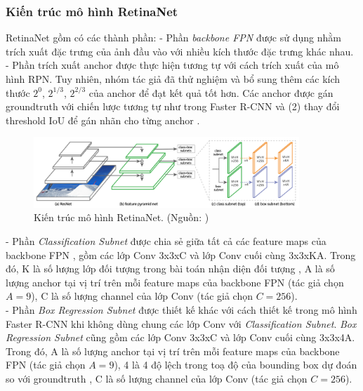 {    \subsubsection{Kiến trúc mô hình RetinaNet}
    RetinaNet  gồm có các thành phần:
    - Phần \textit{backbone FPN} được sử dụng nhằm trích xuất đặc trưng của ảnh đầu vào với nhiều kích thước đặc trưng khác nhau.
    - Phần trích xuất anchor  được thực hiện tương tự với cách trích xuất của mô hình RPN.
    Tuy nhiên, nhóm tác giả đã thử nghiệm và bổ sung thêm các kích thước $2^{0}$, $2^{1/3}$, $2^{2/3}$ của anchor  để đạt kết quả tốt hơn.
    Các anchor  được gán groundtruth  với chiến lược tương tự như trong Faster R-CNN  \cite{ren2015faster} và (2) thay đổi threshold IoU  để gán nhãn cho từng anchor .

    \begin{figure}[H]
        \centering
        \includegraphics[width=10cm] {images/retinanet_model}
        \caption{Kiến trúc mô hình RetinaNet. (Nguồn: \cite{lin2017focal})}
        \label{fig:retinanet_model}
    \end{figure}

    \noindent
    - Phần \textit{Classification Subnet} được chia sẻ giữa tất cả các feature maps  của backbone FPN , gồm các lớp Conv  3x3xC và lớp Conv  cuối cùng 3x3xKA.
    Trong đó, K là số lượng lớp đối tượng  trong bài toán nhận diện đối tượng , A là số lượng anchor  tại vị trí trên mỗi feature maps  của backbone FPN  (tác giả chọn $A = 9$), C là số lượng channel  của lớp Conv  (tác giả chọn $C = 256$). \\
    - Phần \textit{Box Regression Subnet} được thiết kế khác với cách thiết kế trong mô hình Faster R-CNN  \cite{ren2015faster} khi không dùng chung các lớp Conv  với \textit{Classification Subnet}.
    \textit{Box Regression Subnet} cũng gồm các lớp Conv  3x3xC và lớp Conv  cuối cùng 3x3x4A.
    Trong đó, A là số lượng anchor  tại vị trí trên mỗi feature maps của backbone FPN  (tác giả chọn $A = 9$), 4 là 4 độ lệch trong toạ độ của bounding box  dự đoán so với groundtruth , C là số lượng channel  của lớp Conv  (tác giả chọn $C = 256$).

}
